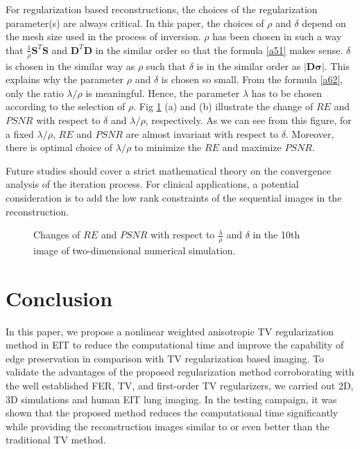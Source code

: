 \documentclass[lettersize,journal]{IEEEtran}
\def\D{\mathbf{D}}
\def\S{\mathbf{S}}
\def\f{\frac}
\def\bmsigma{\bm{\sigma}}
\begin{document}
For regularization based reconstructions, the choices of the regularization parameter(s) are always critical. In this paper, the choices of $\rho$ and $\delta$ depend on the mesh size used in the process of inversion. $\rho$ has been chosen in such a way that $\f{1}{\rho}\S^T \S$ and $\D^T \D$ in the similar order so that the formula \eqref{a51} makes sense. $\delta$ is chosen in the similar way as $\rho$ such that $\delta$ is in the similar order as $|\D\bmsigma|$. This explains why the parameter $\rho$ and $\delta$ is chosen so small. From the formula \eqref{a62}, only the ratio $\lambda/\rho$ is meaningful. Hence, the parameter $\lambda$ has to be chosen according to the selection of $\rho$.
Fig \ref{Change rule_of_quantitative indicators_in Simulation} (a) and (b) illustrate the change of $RE$ and $PSNR$ with respect to $\delta$ and $\lambda/\rho$, respectively. As we can see from this figure, for a fixed $\lambda/\rho$, $RE$ and $PSNR$ are almost invariant with respect to $\delta$. Moreover, there is optimal choice of $\lambda/\rho$ to minimize the $RE$ and maximize $PSNR$.

Future studies should cover a strict mathematical theory on the convergence analysis of the iteration process.
For clinical applications, a potential consideration is to add the low rank constraints of the sequential images \cite{Wang2019a} in the reconstruction.

\begin{figure}[h]
\centering
{}
\centering
\caption{Changes of $RE$ and $PSNR$ with respect to $\frac{\lambda}{\rho}$ and $\delta$ in the 10th image of two-dimensional numerical simulation.}
\label{Change rule_of_quantitative indicators_in Simulation}
\end{figure}





\section{Conclusion}

In this paper, we propose a nonlinear weighted anisotropic TV regularization method in EIT to reduce the computational time and improve the capability of edge preservation in comparison with TV regularization based imaging. To validate the advantages of the proposed regularization method corroborating with the well established FER, TV, and first-order TV regularizers, we carried out 2D, 3D simulations and human EIT lung imaging.
In the testing campaign, it was shown that the proposed method reduces the computational time significantly while providing the reconstruction images similar to or even better than the traditional TV method.
\end{document}
